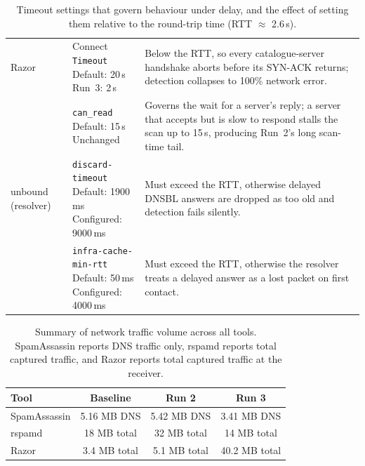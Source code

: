 \begin{table}[H]
\begin{tabular}{@{}p{2.1cm} p{4.4cm} p{5.7cm}@{}}
Razor &
\makecell[l]{Connect \texttt{Timeout}\\
\hspace{1em}Default: 20\,s\\
\hspace{1em}Run~3: 2\,s} &
Below the RTT, so every catalogue-server handshake aborts before its SYN-ACK returns; detection collapses to 100\% network error. \\
\cmidrule(l){2-3}

&
\makecell[l]{\texttt{can\_read}\\
\hspace{1em}Default: 15\,s\\
\hspace{1em}Unchanged} &
Governs the wait for a server's reply; a server that accepts but is slow to respond stalls the scan up to 15\,s, producing Run~2's long scan-time tail. \\
\midrule

unbound \newline (resolver) &
\makecell[l]{\texttt{discard-timeout}\\
\hspace{1em}Default: 1900\,ms\\
\hspace{1em}Configured: 9000\,ms} &
Must exceed the RTT, otherwise delayed DNSBL answers are dropped as too old and detection fails silently. \\
\cmidrule(l){2-3}

&
\makecell[l]{\texttt{infra-cache-min-rtt}\\
\hspace{1em}Default: 50\,ms\\
\hspace{1em}Configured: 4000\,ms} &
Must exceed the RTT, otherwise the resolver treats a delayed answer as a lost packet on first contact. \\

\bottomrule
\end{tabular}
\caption{Timeout settings that govern behaviour under delay, and the effect of setting them relative to the round-trip time (RTT $\approx$ 2.6\,s).}
\label{tab:config-impact}
\end{table}



\begin{table}[H]
\centering
\small
\begin{tabular}{@{}lccc@{}}
\toprule
Tool & Baseline & Run 2 & Run 3 \\
\midrule
SpamAssassin & 5.16 MB DNS & 5.42 MB DNS & 3.41 MB DNS \\
rspamd       & 18 MB total & 32 MB total & 14 MB total \\
Razor        & 3.4 MB total & 5.1 MB total & 40.2 MB total \\
\bottomrule
\end{tabular}
\caption{Summary of network traffic volume across all tools. SpamAssassin reports DNS traffic only, rspamd reports total captured traffic, and Razor reports total captured traffic at the receiver.}
\label{tab:summary-network}
\end{table}

